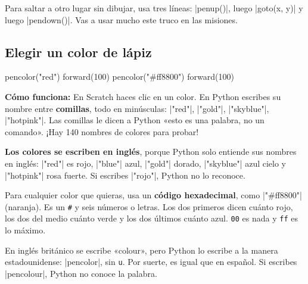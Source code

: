 \begin{think}
Para saltar a otro lugar sin dibujar, usa tres líneas: \py|penup()|, luego \py|goto(x, y)| y luego \py|pendown()|. Vas a usar mucho este truco en las misiones.
\end{think}

\subsection*{Elegir un color de lápiz}

\begin{tcbraster}[raster columns=2, raster equal height=rows, raster column skip=12pt, raster valign=center]
\begin{tcolorbox}[colback=white, colframe=white, boxrule=0pt, valign=center]
\begin{scratch}
\end{scratch}
\end{tcolorbox}
\begin{code}
pencolor("red")
forward(100)
pencolor("#ff8800")
forward(100)
\end{code}
\end{tcbraster}

\textbf{Cómo funciona:} En Scratch haces clic en un color. En Python escribes su nombre entre \textbf{comillas}, todo en minúsculas: \py|"red"|, \py|"gold"|, \py|"skyblue"|, \py|"hotpink"|. Las comillas le dicen a Python «esto es una palabra, no un comando». ¡Hay 140 nombres de colores para probar!

\textbf{Los colores se escriben en inglés}, porque Python solo entiende sus nombres en inglés: \py|"red"| es rojo, \py|"blue"| azul, \py|"gold"| dorado, \py|"skyblue"| azul cielo y \py|"hotpink"| rosa fuerte. Si escribes \py|"rojo"|, Python no lo reconoce.

Para cualquier color que quieras, usa un \textbf{código hexadecimal}, como \py|"#ff8800"| (naranja). Es un \texttt{\#} y seis números o letras. Los dos primeros dicen cuánto rojo, los dos del medio cuánto verde y los dos últimos cuánto azul. \texttt{00} es nada y \texttt{ff} es lo máximo.

\begin{watchout}
En inglés británico se escribe «colour», pero Python lo escribe a la manera estadounidense: \py|pencolor|, sin \texttt{u}. Por suerte, es igual que en español. Si escribes \py|pencolour|, Python no conoce la palabra.
\end{watchout}

